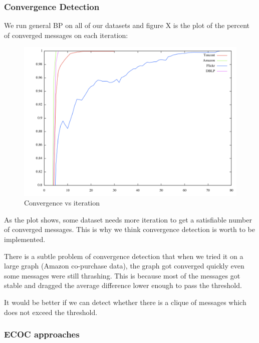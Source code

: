 \subsubsection{Convergence Detection}
We run general BP on all of our datasets and figure X is the plot of the percent of converged messages on each iteration:
\begin{figure}[!ht]
\centering
\begin{minipage}[b]{0.5\linewidth}
\centering
\includegraphics[width=\textwidth]{FIG/Converge.png}
\caption{Convergence vs iteration}
\end{minipage}
\end{figure}	

As the plot shows, some dataset needs more iteration to get a satisfiable number of converged messages. This is why we think convergence detection is worth to be implemented.

There is a subtle problem of convergence detection that when we tried it on a large graph (Amazon co-purchase data), the graph got converged quickly even some messages were still thrashing. This is because most of the messages got stable and dragged the average difference lower enough to pass the threshold.

It would be better if we can detect whether there is a clique of messages which does not exceed the threshold.


\subsubsection{ECOC approaches}
